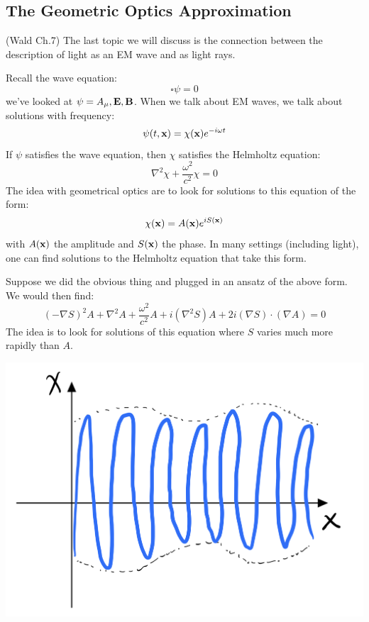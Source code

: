\subsection{The Geometric Optics Approximation}
(Wald Ch.7) The last topic we will discuss is the connection between the description of light as an EM wave and as light rays.

Recall the wave equation:
\begin{equation}
    \square \psi = 0
\end{equation}
we've looked at $\psi = A_\mu, \mathbf{E}, \mathbf{B}$. When we talk about EM waves, we talk about solutions with frequency:
\begin{equation}
    \psi(t, \mathbf{x}) = \chi(\mathbf{x})e^{-i\omega t}
\end{equation}
If $\psi$ satisfies the wave equation, then $\chi$ satisfies the Helmholtz equation:
\begin{equation}
    \nabla^2 \chi + \frac{\omega^2}{c^2}\chi = 0
\end{equation}
The idea with geometrical optics are to look for solutions to this equation of the form:
\begin{equation}
    \chi(\mathbf{x}) = A(\mathbf{x})e^{iS(\mathbf{x})}
\end{equation}
with $A(\mathbf{x})$ the amplitude and $S(\mathbf{x})$ the phase. In many settings (including light), one can find solutions to the Helmholtz equation that take this form.

Suppose we did the obvious thing and plugged in an ansatz of the above form. We would then find:
\begin{equation}
    (-\nabla S)^2 A + \nabla^2 A + \frac{\omega^2}{c^2}A + i(\nabla^2 S)A + 2i(\nabla S)\cdot(\nabla A) = 0
\end{equation}
The idea is to look for solutions of this equation where $S$ varies much more rapidly than $A$.

\begin{center}
    \includegraphics[scale=0.35]{Lectures/Images/lec16-phaseamp.png}
\end{center}

